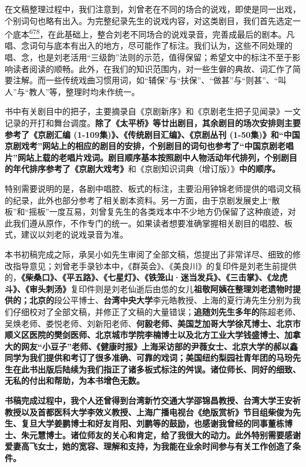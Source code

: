 在文稿整理过程中，我们注意到，刘曾老在不同的场合的说戏，即使是同一出戏，个别词句也略有出入。为完整纪录先生的说戏内容，对这类剧目，我们首先选定一个底本\protect\hyperlink{fn678}{\textsuperscript{678}}，在此基础上，整合刘老不同场合的说戏录音，完善成最后的剧本。凡唱、念词句与底本有出入的地方，尽可能作了标注。我们认为，这些不同处理的唱、念，也是刘老活用``三级韵''法则的示范，值得保留；希望文中的标注不至于影响读者阅读的顺畅。此外，在我们的知识范围内，对一些生僻的典故、词汇作了简要注解。而一些传统戏曲习惯用词，如``辅保''与``扶保''、``做甚''与``则甚''、``叫人''与``教人''等，整理时均未作统一。

书中有关剧目中的把子，主要摘录自《京剧新序》和《京剧老生把子见闻录》一文记录的开打和舞台调度。\textbf{除了《太平桥》等廿出剧目，其余剧目的场次安排则主要参考了《京剧汇编
(1-109集)》、《传统剧目汇编》、《京剧丛刊
(1-50集)》和``中国京剧戏考''网站上的相应的剧目的安排，个别剧目的词句也参考了``中国京剧老唱片''网站上载的老唱片戏词。剧目顺序基本按照剧中人物活动年代排列，个别剧目的年代排序参考了《京剧大戏考》}和《京剧知识词典（增订版）》\textbf{中的顺序。}

特别需要说明的是，各剧中唱腔、板式的标注，主要沿用钟锦老师提供的唱词文稿的纪录，此外也部分参考了相关剧本资料。另一方面，由于京剧发展史上``散板''和``摇板''一度互易，刘曾复先生的各类戏本中不少地方仍保留了这种痕迹，对此我们遵从原作，不作专门的统一。如果读者想要准确掌握相关剧目的唱腔、板式，建议以刘老的说戏录音为准。

本书初稿完成之际，承吴小如先生审阅了全部文稿，怹提出了非常详尽、细致的修改指导意见；刘曾老手录钞本中，《群英会》、《美良川》的复印件是刘老生前提供的，\textbf{《柴桑口》、《平五路》、《七星灯》、《铁笼山·迷当发兵》、《三击掌》、《龙虎斗》、《审头刺汤》}复印件则是刘老仙逝后由怹的女儿\textbf{祖敬阿姨在整理刘老遗物时提供的；北京的}段公平博士、\textbf{台湾中央大学}李元皓教授、上海的夏行涛先生分别为我们仔细校对了全部文稿，并修正了文稿的大量错误；\textbf{追随刘先生多年的}陈超老师、吴焕老师、娄悦老师、刘新阳老师、\textbf{何毅老师、美国芝加哥大学徐芃博士、北京市顺义区医院的樊剑医师、北京城市学院李楠博士以及北方工业大学钱盛博士、加拿大的网友``小豆子''老师、《健康时报》上海采访部的尹薇女士、北京大学的郝以鑫同学为我们提供和考订了很多准确、可靠的戏词；美国纽约梨园社青年团的马玢先生在此书出版后陆续为我们指正了诸多板式标注的舛误。诸位师长、同好的细致、无私的付出和帮助，为本书增色无数。}

\textbf{书稿完成过程中，我个人还曾得到台湾新竹交通大学邵锦昌教授、台湾大学王安祈教授以及首都医科大学李效义教授、上海广播电视台《绝版赏析》节目组柴俊为先生、复旦大学姜鹏博士和好友肖阳、刘鹏等的鼓励，也感谢我曾经的同事董栋博士、朱元慧博士。诸位师友的关心和肯定，给了我很大的动力。此外特别需要感谢爱妻高飞女士，她的宽容、理解和支持，为我能在业余时间参与有关工作创造了条件。}

